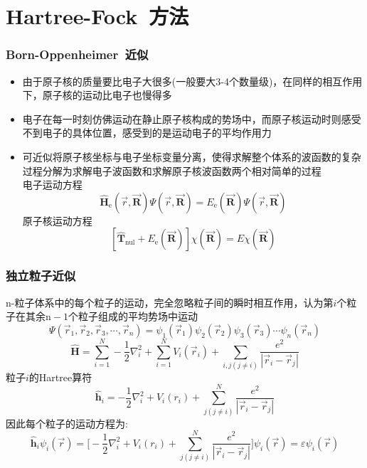 \documentclass[cjk,slidestop,compress,mathserif,blue]{beamer}
\begin{document}
\section{\rm{Hartree-Fock~}方法}
\frame
{
	\frametitle{\textrm{Born-Oppenheimer~}近似}
	\begin{itemize}
		\item 由于原子核的质量要比电子大很多(一般要大3-4个数量级)，在同样的相互作用下，原子核的运动比电子也慢得多
		\item 电子在每一时刻仿佛运动在静止原子核构成的势场中，而原子核运动时则感受不到电子的具体位置，感受到的是运动电子的平均作用力
		\item 可近似将原子核坐标与电子坐标变量分离，使得求解整个体系的波函数的复杂过程分解为求解电子波函数和求解原子核波函数两个相对简单的过程\\
			电子运动方程$$\hat{\mathbf H}_{\mathrm e}(\vec r,\vec{\mathbf R})\Psi(\vec r,\vec{\mathbf R})=E_{\mathrm e}(\vec{\mathbf R})\Psi(\vec r,\vec{\mathbf R})$$
			原子核运动方程$$[\hat{\mathbf T}_{\mathrm{nul}}+E_{\mathrm e}(\vec{\mathbf R})]\chi(\vec{\mathbf R})=E\chi(\vec{\mathbf R})$$
	\end{itemize}
}

\frame
{
	\frametitle{独立粒子近似}
	\textrm{n-}粒子体系中的每个粒子的运动，完全忽略粒子间的瞬时相互作用，认为第$i$个粒子在其余$\mathrm{n}-1$个粒子组成的平均势场中运动
	$$\Psi(\vec r_1,\vec r_2,\vec r_3,\cdots,\vec r_n)=\psi_1(\vec r_1)\psi_2(\vec r_2)\psi_3(\vec r_3)\cdots\psi_n(\vec r_n)$$
	$$\hat{\mathbf H}=\sum_{i=1}^N-\dfrac{1}{2}\nabla_i^2+\sum_{i=1}^NV_i(\vec r_i)+\sum_{i,j(j\neq i)}\dfrac{e^2}{|\vec r_i-\vec r_j|}$$
	粒子$i$的\textrm{Hartree}算符
	$$\hat{\mathbf h}_i=-\dfrac{1}{2}\nabla_i^2+V_i(r_i)+\sum_{j(j\neq i)}^N\dfrac{e^2}{|\vec r_i-\vec r_j|}$$
	因此每个粒子的运动方程为:
	$$\hat{\mathbf h}_i\psi_i(\vec r)=\bigg[-\dfrac{1}{2}\nabla_i^2+V_i(r_i)+\sum_{j(j\neq i)}^N\dfrac{e^2}{|\vec r_i-\vec r_j|}\bigg]\psi_i(\vec r)=\varepsilon\psi_i(\vec r)$$ 
}
\end{document}
